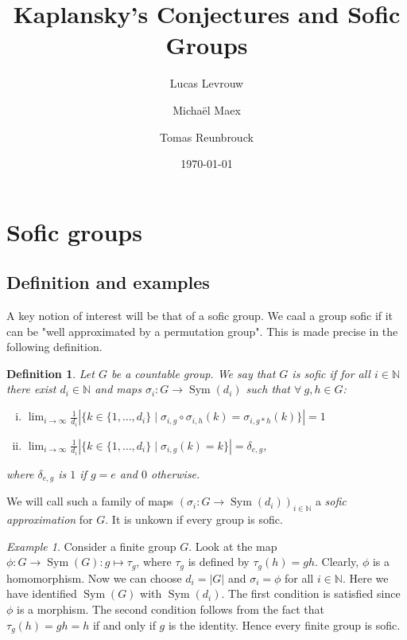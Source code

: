 \documentclass[titlepage, a4paper]{article}
\author{Lucas Levrouw \and Michaël Maex \and Tomas Reunbrouck}
\title{Kaplansky's Conjectures and Sofic Groups}
\date{\today}
\newcommand{\N}{\mathbb{N}}
\newcommand{\card}[1]{\left| #1 \right|}
\DeclareMathOperator{\sym}{Sym}
\newtheorem{definition}{Definition}
\theoremstyle{remark}
\newtheorem{example}{Example}
\begin{document}
    \maketitle
{}

\section{Sofic groups}

\subsection{Definition and examples}

    A key notion of interest will be that of a sofic group. We caal a group sofic if it can be "well approximated by a permutation group". This is made precise in the following definition.

    \begin{definition}\label{def:Sofic}
        Let $G$ be a countable group. We say that $G$ is sofic if for all $i\in \N$ there exist $d_i \in \N$ and maps $\sigma_i : G \to \sym(d_i)$ such that $\forall\ g, h \in G$:
        \begin{enumerate}[(i)]
            \item $\displaystyle \lim_{i\to \infty} \frac{1}{d_i} \card{\big\{k \in \{1, \dots, d_i\} \mid \sigma_{i,g} \circ \sigma_{i,h}(k) = \sigma_{i, g*h} (k) \big\}} = 1$
            \item $\displaystyle \lim_{i\to \infty} \frac{1}{d_i}  \card{\big\{k \in \{1, \dots, d_i\} \mid \sigma_{i,g}(k) = k \big\}} = \delta_{e,g}$,
        \end{enumerate}
        where $\delta_{e,g}$ is $1$ if $g = e$ and $0$ otherwise.
    \end{definition}

    We will call such a family of maps $\left(\sigma_i : G \to \sym(d_i) \right)_{i \in \N}$ a \emph{sofic approximation} for $G$. It is unkown if every group is sofic.

    \begin{example}
    Consider a finite group $G$. Look at the map $\phi: G \to \sym(G): g \mapsto \tau_g$, where $\tau_g$ is defined by $\tau_g(h) = gh$. Clearly, $\phi$ is a homomorphism. Now we can choose $d_i = \card G$ and $\sigma_i = \phi$ for all $i \in \N$. Here we have identified $\sym(G)$ with $\sym(d_i)$. The first condition is satisfied since $\phi$ is a morphism. The second condition follows from the fact that $\tau_g(h) = gh = h$ if and only if $g$ is the identity.
     Hence every finite group is sofic.
    \end{example}
\end{document}
